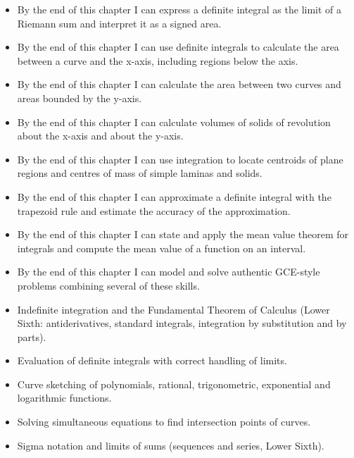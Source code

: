 \documentclass[11pt]{article}
\begin{document}
\begin{objectifs}
\begin{itemize}
\item By the end of this chapter I can express a definite integral as the limit of a Riemann sum and interpret it as a signed area.
\item By the end of this chapter I can use definite integrals to calculate the area between a curve and the x-axis, including regions below the axis.
\item By the end of this chapter I can calculate the area between two curves and areas bounded by the y-axis.
\item By the end of this chapter I can calculate volumes of solids of revolution about the x-axis and about the y-axis.
\item By the end of this chapter I can use integration to locate centroids of plane regions and centres of mass of simple laminas and solids.
\item By the end of this chapter I can approximate a definite integral with the trapezoid rule and estimate the accuracy of the approximation.
\item By the end of this chapter I can state and apply the mean value theorem for integrals and compute the mean value of a function on an interval.
\item By the end of this chapter I can model and solve authentic GCE-style problems combining several of these skills.
\end{itemize}
\end{objectifs}

\begin{prerequis}
\begin{itemize}
\item Indefinite integration and the Fundamental Theorem of Calculus (Lower Sixth: antiderivatives, standard integrals, integration by substitution and by parts).
\item Evaluation of definite integrals with correct handling of limits.
\item Curve sketching of polynomials, rational, trigonometric, exponential and logarithmic functions.
\item Solving simultaneous equations to find intersection points of curves.
\item Sigma notation and limits of sums (sequences and series, Lower Sixth).
\end{itemize}
\end{prerequis}
\end{document}

